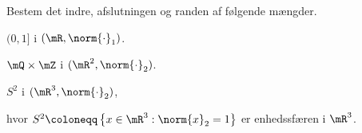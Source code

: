 \begin{opg}
Bestem det indre, afslutningen og randen af følgende mængder.
	\begin{tasks}{3}
	    \item $(0,1]$ i $(\mR,\norm{\cdot}_1)$.
		\item $\mQ \times \mZ$ i $(\mR^2,\norm{\cdot}_2)$.
		\item $S^2$ i $(\mR^3,\norm{\cdot}_2)$,
	\end{tasks}
	hvor $S^2\coloneqq \left\{x\in\mR^3 : \norm{x}_2=1\right\}$ er enhedssfæren i $\mR^3$.
\end{opg}